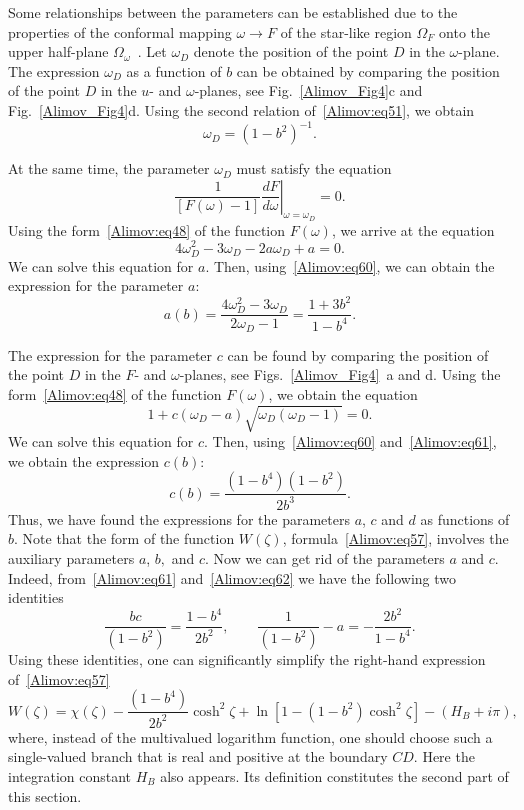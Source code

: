\documentclass[
11pt,%
tightenlines,%
twoside,%
onecolumn,%
nofloats,%
nobibnotes,%
nofootinbib,%
superscriptaddress,%
noshowpacs,%
centertags]%
{revtex4-2}
\begin{document}
Some relationships between the parameters can be established due to the properties of the conformal
mapping $\omega \to F$ of the star-like region $\Omega_F $ onto the upper half-plane
$\Omega_\omega$~\cite{Alimov:bib21}. Let $\omega_D$ denote the position of the point $D$ in the
$\omega$-plane. The expression $\omega_D $ as a function of $b$ can be obtained by comparing the
position of the point $D$ in the $u$- and $\omega$-planes, see Fig.~\ref{Alimov_Fig4}c and
Fig.~\ref{Alimov_Fig4}d. Using the second relation of~\eqref{Alimov:eq51}, we obtain
\begin{equation}
\label{Alimov:eq60} \omega_D = \left( {1 - b^2} \right)^{-1}.
\end{equation}

At the same time, the parameter $\omega_D$ must satisfy the equation~\cite{Alimov:bib21}
\[
\left. {\frac{1}{\left[ {F(\omega)-1} \right]}\frac{dF}{d\omega}} \right|_{\omega = \omega_D }= 0.
\]
Using the form~\eqref{Alimov:eq48} of the function $F(\omega)$, we arrive at the equation
\[
4\omega_D^2 - 3\omega_D - 2a\omega_D + a = 0.
\]
We can solve this equation for $a$. Then, using~\eqref{Alimov:eq60}, we can obtain the expression
for the parameter $a$:
\begin{equation}
\label{Alimov:eq61} a(b) = \frac{4\omega_D^2 - 3\omega_D}{2\omega_D - 1} = \frac{1+3b^2}{1-b^4}.
\end{equation}

The expression for the parameter $c$ can be found by comparing the position of the point $D$ in the
$F$- and $\omega$-planes, see Figs.~\ref{Alimov_Fig4}~a and d. Using the
form~\eqref{Alimov:eq48} of the function $F(\omega)$, we obtain the equation
\[
1 + c(\omega_D - a)\sqrt {\omega_D (\omega_D - 1)} = 0.
\]
We can solve this equation for $c$. Then, using~\eqref{Alimov:eq60} and~\eqref{Alimov:eq61}, we
obtain the expression $c(b)$:
\begin{equation}
\label{Alimov:eq62} c(b) = \frac{\left( {1 - b^4} \right)\left( {1 - b^2} \right)}{2b^3}.
\end{equation}
Thus, we have found the expressions for the parameters $a$, $c$ and $d$ as functions of $b$. Note
that the form of the function $W(\zeta )$, formula~\eqref{Alimov:eq57}, involves the auxiliary
parameters $a$, $b,$ and $c$. Now we can get rid of the parameters $a$ and $c$. Indeed,
from~\eqref{Alimov:eq61} and~\eqref{Alimov:eq62} we have the following two identities
\[
\frac{bc}{\left( {1 - b^2} \right)} = \frac{1 - b^4}{2b^2}, \quad \quad  \frac{1}{\left( {1 - b^2}
\right)}-a = - \frac{2b^2}{1 - b^4}.
\]
Using these identities, one can significantly simplify the right-hand expression
of~\eqref{Alimov:eq57}
\begin{equation}
\label{Alimov:eq63} W(\zeta) = \chi (\zeta ) - \frac{\left({1 - b^4} \right)}{2b^2}\cosh^2\zeta +
\ln \left[ {1 - \left( {1-b^2} \right)\cosh^2\zeta } \right] - \left( {H_B + i\pi } \right),
\end{equation}
where, instead of the multivalued logarithm function, one should choose such a
single-valued branch that is real and positive at the boundary $CD$. Here the integration constant
$H_B $ also appears. Its definition constitutes the second part of this section.
\end{document}
